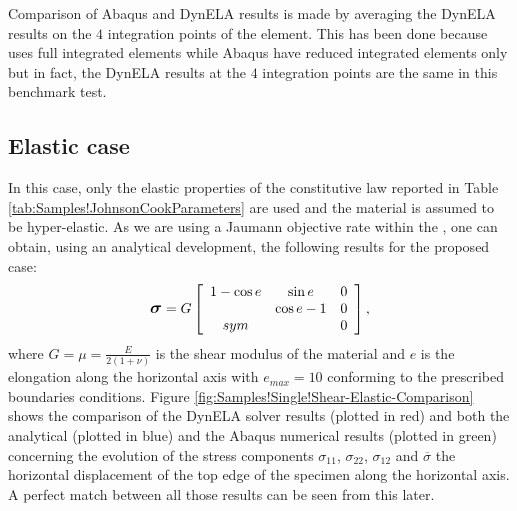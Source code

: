 Comparison of Abaqus and DynELA results is made by averaging the DynELA
results on the $4$ integration points of the element. This has been
done because \DynELA uses full integrated elements while Abaqus
have reduced integrated elements only but in fact, the DynELA results
at the $4$ integration points are the same in this benchmark test.

\subsection{Elastic case}

In this case, only the elastic properties of the constitutive law
reported in Table \ref{tab:Samples!JohnsonCookParameters} are used
and the material is assumed to be hyper-elastic. As we are using a
Jaumann objective rate within the \DynELA, one can obtain, using
an analytical development, the following results for the proposed
case:
\begin{equation}
\mbox{\large\ensuremath{\boldsymbol{\sigma}}}=G\left[\begin{array}{ccc}
1-\cos e & \sin e & 0\\
 & \cos e-1 & 0\\
sym &  & 0
\end{array}\right],
\end{equation}
where $G=\mu=\frac{E}{2(1+\nu)}$ is the shear modulus of the material
and $e$ is the elongation along the horizontal axis with $e_{max}=10$
conforming to the prescribed boundaries conditions. Figure \ref{fig:Samples!Single!Shear-Elastic-Comparison}
shows the comparison of the DynELA solver results (plotted in red)
and both the analytical (plotted in blue) and the Abaqus numerical
results (plotted in green) concerning the evolution of the stress
components $\sigma_{11}$, $\sigma_{22}$, $\sigma_{12}$ and $\overline{\sigma}$
\versus  the horizontal displacement of the top edge of the specimen
along the horizontal axis. A perfect match between all those results
can be seen from this later.

